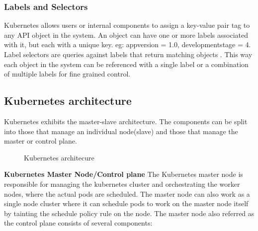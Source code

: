 \documentclass[9pt,twocolumn,twoside]{../../styles/osajnl}
\begin{document}
{\subsubsection{Labels and Selectors}
Kubernetes allows users or internal components to assign a key-value
pair tag to any API object in the system. An object can have one or
more labels associated with it, but each with a unique key. eg:
appversion = 1.0, development\textunderscore stage = 4. Label
selectors are queries against labels that return matching objects
\cite{www-kubernetes-digitalocean}. This way each object in the system
can be referenced with a single label or a combination of multiple
labels for fine grained control.

\subsection{Kubernetes architecture}
Kubernetes exhibits the master-slave architecture. The components can
be split into those that manage an individual node(slave) and those
that manage the master or control plane.

\begin{figure}[htbp]
\centering
{}
\caption{Kubernetes architecure \cite{www-kubernetes-architecture}}
\label{fig:Kubernetes Minimum Architecture}
\end{figure}

\noindent
\textbf{Kubernetes Master Node/Control plane}
\newline
The Kubernetes master node is responsible for managing the kubernetes
cluster and orchestrating the worker nodes, where the actual pods are
scheduled. The master node can also work as a single node cluster
where it can schedule pods to work on the master node itself by
tainting the schedule policy rule on the node. The master node also
referred as the control plane consists of several components:

}
\end{document}
